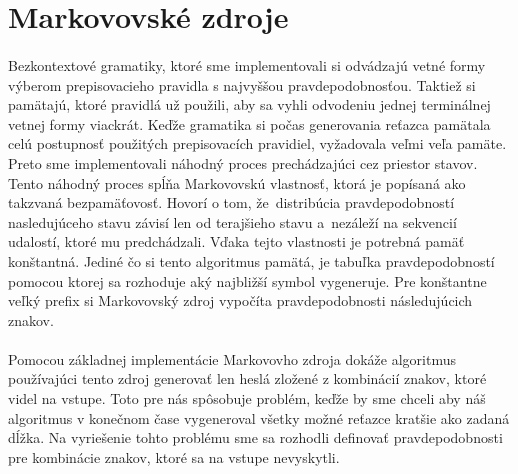 \section{Markovovské zdroje}
\paragraph{}
Bezkontextové gramatiky, ktoré sme implementovali si odvádzajú vetné formy výberom prepisovacieho pravidla s najvyššou pravdepodobnosťou. Taktiež si pamätajú, ktoré pravidlá už použili, aby sa vyhli odvodeniu jednej terminálnej vetnej formy viackrát. Keďže gramatika si počas generovania reťazca pamätala celú postupnosť použitých prepisovacích pravidiel, vyžadovala veľmi veľa pamäte. Preto sme implementovali náhodný proces prechádzajúci cez priestor stavov. Tento náhodný proces spĺňa Markovovskú vlastnosť, ktorá je popísaná ako takzvaná bezpamäťovosť. Hovorí o tom, že~distribúcia pravdepodobností nasledujúceho stavu závisí len od terajšieho stavu a~nezáleží na sekvencií udalostí, ktoré mu predchádzali. Vďaka tejto vlastnosti je potrebná pamäť konštantná. Jediné čo si tento algoritmus pamätá, je tabuľka pravdepodobností pomocou ktorej sa rozhoduje aký najbližší symbol vygeneruje. Pre konštantne veľký prefix si Markovovský zdroj vypočíta pravdepodobnosti následujúcich znakov.

\paragraph{}
Pomocou základnej implementácie Markovovho zdroja dokáže algoritmus používajúci tento zdroj generovať len heslá zložené z kombinácií znakov, ktoré videl na vstupe. Toto pre nás spôsobuje problém, keďže by sme chceli aby náš algoritmus v konečnom čase vygeneroval všetky možné reťazce kratšie ako zadaná dĺžka. Na vyriešenie tohto problému sme sa rozhodli definovať pravdepodobnosti pre kombinácie znakov, ktoré sa na vstupe nevyskytli.